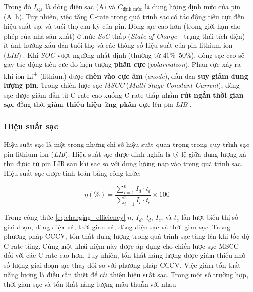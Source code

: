 \documentclass{thesis}
\begin{document}
Trong đó $I_{\text{sạc}}$ là dòng điện sạc (\si{\ampere}) và $C_{\text{định mức}}$ là dung lượng định mức của pin (\si{\ampere\hour}).
Tuy nhiên, việc tăng C-rate trong quá trình sạc có tác động tiêu cực đến hiệu suất sạc và tuổi thọ chu kỳ của pin. Dòng sạc cao hơn (trong giới hạn cho phép của nhà sản xuất) ở mức \textit{SoC} thấp (\textit{State of Charge} - trạng thái tích điện) ít ảnh hưởng xấu đến tuổi thọ và các thông số hiệu suất của pin lithium-ion (\textit{LIB}) \cite{ref71}.
Khi \textit{SOC} vượt ngưỡng nhất định (thường từ 40\%--50\%), dòng sạc cao sẽ gây tác động tiêu cực do hiện tượng \textbf{phân cực} (\textit{polarization}). Phân cực xảy ra khi ion Li\textsuperscript{+} (lithium) được \textbf{chèn vào cực âm} (\textit{anode}), dẫn đến \textbf{suy giảm dung lượng pin}.
Trong chiến lược sạc \textit{MSCC} (\textit{Multi-Stage Constant Current}), dòng sạc được giảm dần từ C-rate cao xuống C-rate thấp nhằm \textbf{rút ngắn thời gian sạc} đồng thời \textbf{giảm thiểu hiệu ứng phân cực} lên pin \textit{LIB} \cite{ref71}.



\subsubsection{Hiệu suất sạc}


Hiệu suất sạc là một trong những chỉ số hiệu suất quan trọng trong quy trình sạc pin lithium-ion (\textit{LIB}). Hiệu suất sạc được định nghĩa là tỷ lệ giữa dung lượng xả thu được từ pin LIB sau khi sạc so với dung lượng nạp vào trong quá trình sạc. Hiệu suất sạc được tính toán bằng công thức:

\begin{equation}
\eta (\%) = \frac{\sum_{i=1}^{n} I_d \cdot t_d}{\sum_{i=1}^{n} I_c \cdot t_c} \times 100
\label{eq:charging_efficiency}
\end{equation}

Trong công thức \eqref{eq:charging_efficiency}   $n$, $I_d$, $t_d$, $I_c$, và $t_c$ lần lượt biểu thị số giai đoạn, dòng điện xả, thời gian xả, dòng điện sạc và thời gian sạc. Trong phương pháp CCCV, tổn thất dung lượng trong quá trình sạc tăng lên khi tốc độ C-rate tăng. Cùng một khái niệm này được áp dụng cho chiến lược sạc MSCC đối với các C-rate cao hơn. Tuy nhiên, tổn thất năng lượng được giảm thiểu nhờ số lượng giai đoạn sạc thay đổi so với phương pháp CCCV. Việc giảm tổn thất năng lượng là điều cần thiết để cải thiện hiệu suất sạc. Trong một số trường hợp, thời gian sạc và tổn thất năng lượng mâu thuẫn với nhau \cite{ref72,ref73}
\end{document}
